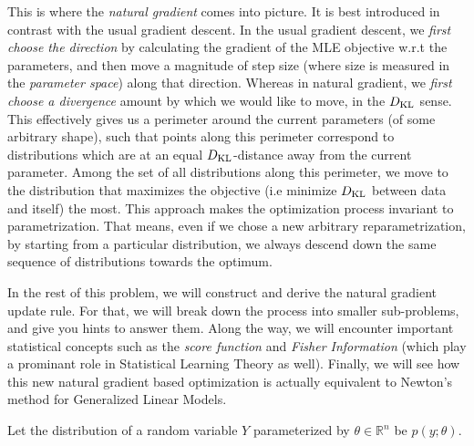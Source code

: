 This is where the \emph{natural gradient} comes into picture. It is best introduced in contrast
with the usual gradient descent. In the usual gradient descent, we \emph{first choose the direction}
by calculating the gradient of the MLE objective w.r.t the parameters, and then move a magnitude of
step size (where size is measured in the \emph{parameter space}) along that direction. Whereas
in natural gradient, we \emph{first choose a divergence} amount by which we would like to
move, in the $D_{\text{KL}}$ sense. This effectively gives us a perimeter around the current parameters (of
some arbitrary shape), such that points along this perimeter correspond to distributions
which are at an equal $D_{\text{KL}}$-distance away from the current parameter. Among the set
of all distributions along this perimeter, we move to the distribution that maximizes the
objective (i.e minimize $D_{\text{KL}}$ between data and itself) the most. This approach makes the optimization
process invariant to parametrization. That means, even if we chose a new arbitrary reparametrization,
by starting from a particular distribution, we always descend down the same sequence of
distributions towards the optimum.


In the rest of this problem, we will construct and derive the natural gradient update rule.
For that, we will break down the process into smaller sub-problems, and give you hints
to answer them. Along the way, we will encounter important statistical concepts such
as the \emph{score function} and \emph{Fisher Information} (which play a prominant role
in Statistical Learning Theory as well). Finally, we will see how this new natural gradient
based optimization is actually equivalent to Newton's method for Generalized Linear Models.


Let the distribution of a random variable $Y$ parameterized by $\theta \in \mathbb{R}^{n}$ be $p(y;\theta)$.

\begin{enumerate}












\end{enumerate}
